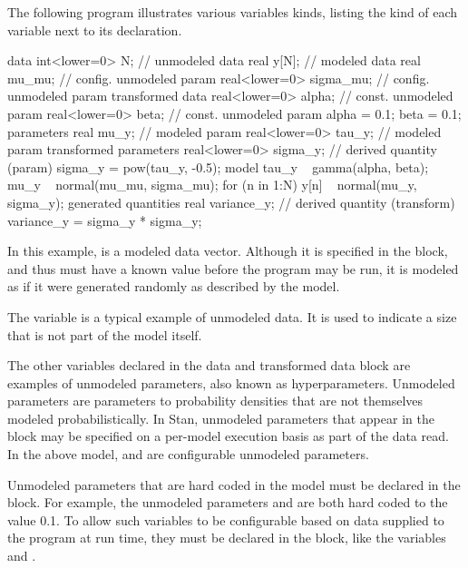 The following program illustrates various variables kinds, listing the
kind of each variable next to its declaration.
%
\begin{stancode}
data {
  int<lower=0> N;           // unmodeled data
  real y[N];                // modeled data
  real mu_mu;               // config. unmodeled param
  real<lower=0> sigma_mu;   // config. unmodeled param
}
transformed data {
  real<lower=0> alpha;      // const. unmodeled param
  real<lower=0> beta;       // const. unmodeled param
  alpha = 0.1;
  beta = 0.1;
}
parameters {
  real mu_y;                // modeled param
  real<lower=0> tau_y;      // modeled param
}
transformed parameters {
  real<lower=0> sigma_y;    // derived quantity (param)
  sigma_y = pow(tau_y, -0.5);
}
model {
  tau_y ~ gamma(alpha, beta);
  mu_y ~ normal(mu_mu, sigma_mu);
  for (n in 1:N)
    y[n] ~ normal(mu_y, sigma_y);
}
generated quantities {
  real variance_y;       // derived quantity (transform)
  variance_y = sigma_y * sigma_y;
}
\end{stancode}
%
In this example,  is a modeled data vector.  Although it is
specified in the  block, and thus must have a known value
before the program may be run, it is modeled as if it were generated
randomly as described by the model.

The variable  is a typical example of unmodeled data.  It is
used to indicate a size that is not part of the model itself.

The other variables declared in the data and transformed data block are
examples of unmodeled parameters, also known as hyperparameters.
Unmodeled parameters are parameters to probability densities that are
not themselves modeled probabilistically.  In Stan, unmodeled
parameters that appear in the  block may be specified on a
per-model execution basis as part of the data read.  In the above
model,  and  are configurable unmodeled
parameters.

Unmodeled parameters that are hard coded in the model must be declared
in the  block.  For example, the unmodeled
parameters  and  are both hard coded to the
value 0.1.  To allow such variables to be configurable based on data
supplied to the program at run time, they must be declared in the
 block, like the variables  and
.

